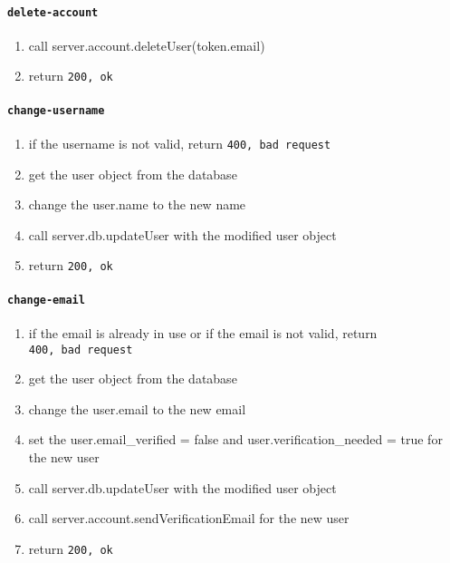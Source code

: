 \hypertarget{delete-account}{%
\paragraph{\texorpdfstring{\texttt{delete-account}}{delete-account}}\label{delete-account}}

\begin{enumerate}
\def\labelenumi{\arabic{enumi}.}
\item
  call server.account.deleteUser(token.email)
\item
  return \texttt{200,\ ok}
\end{enumerate}

\hypertarget{change-username}{%
\paragraph{\texorpdfstring{\texttt{change-username}}{change-username}}\label{change-username}}

\begin{enumerate}
\def\labelenumi{\arabic{enumi}.}
\item
  if the username is not valid, return \texttt{400,\ bad\ request}
\item
  get the user object from the database
\item
  change the user.name to the new name
\item
  call server.db.updateUser with the modified user object
\item
  return \texttt{200,\ ok}
\end{enumerate}

\hypertarget{change-email}{%
\paragraph{\texorpdfstring{\texttt{change-email}}{change-email}}\label{change-email}}

\begin{enumerate}
\def\labelenumi{\arabic{enumi}.}
\item
  if the email is already in use or if the email is not valid, return
  \texttt{400,\ bad\ request}
\item
  get the user object from the database
\item
  change the user.email to the new email
\item
  set the user.email\_verified = false and user.verification\_needed =
  true for the new user
\item
  call server.db.updateUser with the modified user object
\item
  call server.account.sendVerificationEmail for the new user
\item
  return \texttt{200,\ ok}
\end{enumerate}

